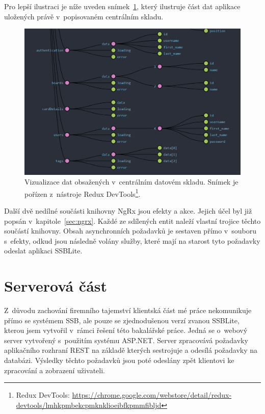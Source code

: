 Pro lepší ilustraci je níže uveden snímek~\ref{img:ngrx-devtools}, který ilustruje část dat aplikace uložených právě v~popisovaném centrálním skladu.

\begin{figure}[H]
	\centering
	\label{img:ngrx-devtools}
	\includegraphics[width=\textwidth]{obrazky-figures/ngrx-chart.png}
	\caption{Vizualizace dat obsažených v~centrálním datovém skladu. Snímek je pořízen z~nástroje Redux DevTools\footnote{Redux DevTools: \url{https://chrome.google.com/webstore/detail/redux-devtools/lmhkpmbekcpmknklioeibfkpmmfibljd}}.}
\end{figure}

Další dvě nedílné součásti knihovny NgRx jsou efekty a akce. Jejich účel byl již popsán v~kapitole~\ref{sec:ngrx}. Každé ze sdílených entit naleží vlastní trojice těchto součástí knihovny. Obsah asynchronních požadavků je sestaven přímo v~souboru s~efekty, odkud jsou následně volány služby, které mají na starost tyto požadavky odeslat aplikaci SSBLite.



\section{Serverová část}
Z~důvodu zachování firemního tajemství klientská část mé práce nekomunikuje přímo se systémem SSB, ale pouze se zjednodušenou verzí zvanou SSBLite, kterou jsem vytvořil v~rámci řešení této bakalářské práce. Jedná se o~webový server vytvořený s~použitím systému ASP.NET. Server zpracovává požadavky aplikačního rozhraní REST na základě kterých sestrojuje a odesílá požadavky na databázi. Výsledky těchto požadavků jsou poté odeslány zpět klientovi ke zpracování a zobrazení uživateli.

